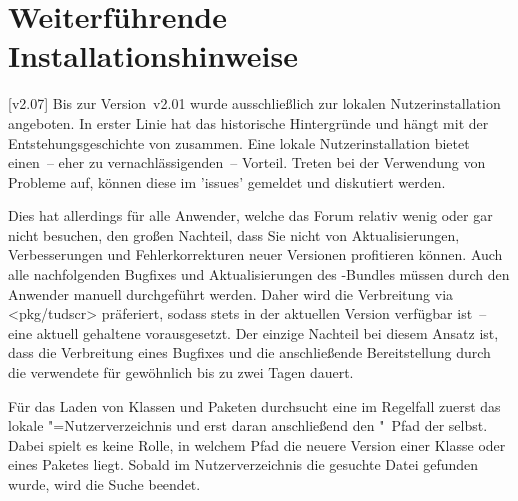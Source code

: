 \chapter{%
  Weiterführende Installationshinweise%
  \label{sec:install:ext}%
}

\NewDocumentCommand{}%

[v2.07]
\bigskip\noindent
Bis zur Version~v2.01 wurde \TUDScript ausschließlich zur lokalen 
Nutzerinstallation angeboten. In erster Linie hat das historische 
Hintergründe und hängt mit der Entstehungsgeschichte von \TUDScript zusammen. 
Eine lokale Nutzerinstallation bietet einen~-- eher zu vernachlässigenden~-- 
Vorteil. Treten bei der Verwendung von \TUDScript Probleme auf, können diese im 
\GitHubRepo'issues' gemeldet und diskutiert werden.

Dies hat allerdings für alle Anwender, welche das Forum relativ wenig oder gar 
nicht besuchen, den großen Nachteil, dass Sie nicht von Aktualisierungen, 
Verbesserungen und Fehlerkorrekturen neuer Versionen profitieren können. Auch 
alle nachfolgenden Bugfixes und Aktualisierungen des \TUDScript-Bundles müssen 
durch den Anwender manuell durchgeführt werden. Daher wird die Verbreitung via 
\CTAN<pkg/tudscr> präferiert, sodass \TUDScript stets in der aktuellen Version 
verfügbar ist~-- eine aktuell gehaltene \Distro vorausgesetzt. Der einzige 
Nachteil bei diesem Ansatz ist, dass die Verbreitung eines Bugfixes und die 
anschließende Bereitstellung durch die verwendete \Distro für gewöhnlich bis zu 
zwei Tagen dauert.

Für das Laden von Klassen und Paketen durchsucht eine \Distro im Regelfall 
zuerst das lokale "=Nutzerverzeichnis und erst daran anschließend 
den "~Pfad der \Distro selbst. Dabei spielt es keine Rolle, in 
welchem Pfad die neuere Version einer Klasse oder eines Paketes liegt. Sobald 
im Nutzerverzeichnis die gesuchte Datei gefunden wurde, wird die Suche beendet.

